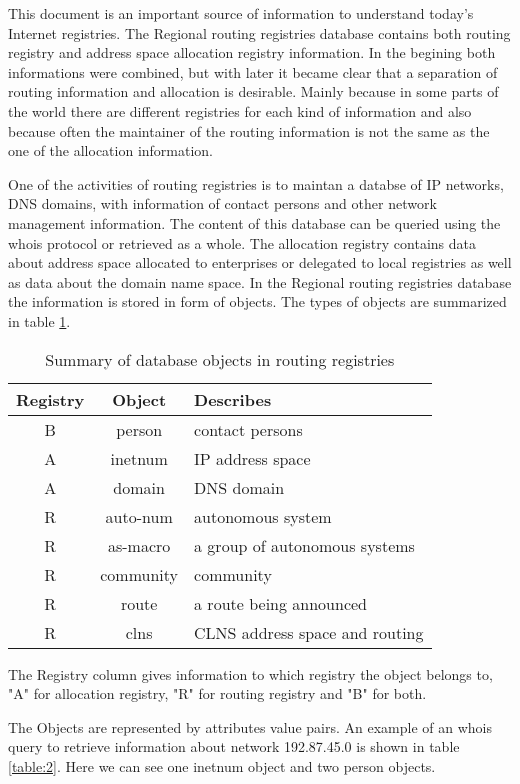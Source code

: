 \documentclass[11pt]{report}
\begin{document}
This document is an important source of information to understand today's Internet registries. 
The Regional routing registries database contains both routing registry and address space allocation registry information. In the begining both informations were combined, but with later it became clear that a separation
of routing information and allocation is desirable. Mainly because in some parts of the world there are different registries for each kind of information and also because often the maintainer of the routing information is not the same as the one of the allocation information.

One of the activities of routing registries is to maintan a databse of IP networks, DNS domains, with information of contact persons and other network management information. The content of this database can be queried using the whois protocol or retrieved as a whole.
The allocation registry contains data about address space allocated to enterprises or delegated to local registries as well as data about the domain name space. 
In the Regional routing registries database the information is stored in form of objects. The types of objects are summarized in table \ref{table:1}.   
   
\begin{table}[h!]
\centering
\begin{tabular}{ | c | c | l | }
\hline
 Registry & Object & Describes \\ \hline
 B & person & contact persons \\
 A & inetnum & IP address space \\
 A & domain & DNS domain \\
 R & auto-num & autonomous system \\
 R & as-macro & a group of autonomous systems \\
 R & community & community \\
 R & route & a route being announced \\
 R & clns & CLNS address space and routing \\
 \hline
\end{tabular}
\caption{Summary of database objects in routing registries}
\label{table:1}
\end{table}

The Registry column gives information to which registry the object belongs to, "A" for allocation registry, "R" for routing registry and "B" for both.

The Objects are represented by attributes value pairs. 
An example of an whois query to retrieve information about network 192.87.45.0 is shown in table \ref{table:2}. Here we can see one inetnum object and two person objects.
\end{document}

